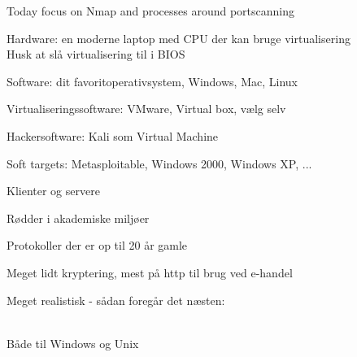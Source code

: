 \documentclass[20pt,landscape,a4paper,footrule]{foils}
\begin{document}
\centerline{Today focus on Nmap and processes around portscanning}



\begin{list2}
\item Hardware: en moderne laptop med CPU der kan bruge virtualisering\\
Husk at slå virtualisering til i BIOS
\item Software: dit favoritoperativsystem, Windows, Mac, Linux
\item Virtualiseringssoftware: VMware, Virtual box, vælg selv
\item Hackersoftware: Kali som Virtual Machine 
\item Soft targets: Metasploitable, Windows 2000, Windows XP, ...
\end{list2}




\begin{list1}
\item Klienter og servere
\item Rødder i akademiske miljøer
\item Protokoller der er op til 20 år gamle
\item Meget lidt kryptering, mest på http til brug ved e-handel
\end{list1}


Meget realistisk - sådan foregår det næsten:\\
\\







\centerline{}
\centerline{Både til Windows og Unix}



\end{document}
